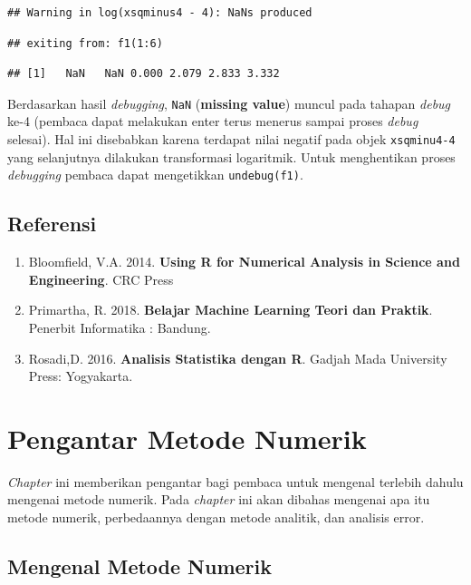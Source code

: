 \documentclass[
]{book}
\providecommand{\tightlist}{%
  \setlength{\itemsep}{0pt}\setlength{\parskip}{0pt}}
\theoremstyle{definition}
\theoremstyle{definition}
\theoremstyle{definition}
\theoremstyle{definition}
\theoremstyle{remark}
\begin{document}
\begin{verbatim}
## Warning in log(xsqminus4 - 4): NaNs produced
\end{verbatim}

\begin{verbatim}
## exiting from: f1(1:6)
\end{verbatim}

\begin{verbatim}
## [1]   NaN   NaN 0.000 2.079 2.833 3.332
\end{verbatim}

Berdasarkan hasil \emph{debugging}, \texttt{NaN} (\textbf{missing value}) muncul pada tahapan \emph{debug} ke-4 (pembaca dapat melakukan enter terus menerus sampai proses \emph{debug} selesai). Hal ini disebabkan karena terdapat nilai negatif pada objek \texttt{xsqminu4-4} yang selanjutnya dilakukan transformasi logaritmik. Untuk menghentikan proses \emph{debugging} pembaca dapat mengetikkan \texttt{undebug(f1)}.

\hypertarget{referensi-3}{%
\section{Referensi}\label{referensi-3}}

\begin{enumerate}
\def\labelenumi{\arabic{enumi}.}
\tightlist
\item
  Bloomfield, V.A. 2014. \textbf{Using R for Numerical Analysis in Science and Engineering}. CRC Press
\item
  Primartha, R. 2018. \textbf{Belajar Machine Learning Teori dan Praktik}. Penerbit Informatika : Bandung.
\item
  Rosadi,D. 2016. \textbf{Analisis Statistika dengan R}. Gadjah Mada University Press: Yogyakarta.
\end{enumerate}

\hypertarget{numericmethod}{%
\chapter{Pengantar Metode Numerik}\label{numericmethod}}

\emph{Chapter} ini memberikan pengantar bagi pembaca untuk mengenal terlebih dahulu mengenai metode numerik. Pada \emph{chapter} ini akan dibahas mengenai apa itu metode numerik, perbedaannya dengan metode analitik, dan analisis error.

\hypertarget{numericmethodintro}{%
\section{Mengenal Metode Numerik}\label{numericmethodintro}}
\end{document}
